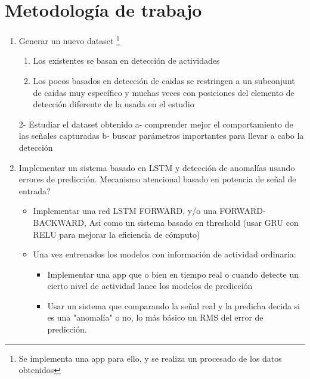 \documentclass[../tfm.tex]{subfiles}
\begin{document}

\section{Metodología de trabajo}


\begin{enumerate}
  \item Generar un nuevo dataset \footnote{Se implementa una app para ello, y se realiza un procesado de los datos obtenidos}
  \begin{enumerate}
    \item Los existentes se basan en detección de actividades
    \item Los pocos basados en detección de caidas se restringen a un subconjunt de caidas muy específico y muchas veces con posiciones del elemento de detección diferente de la usada en el estudio
  \end{enumerate}

  2- Estudiar el dataset obtenido
  a- comprender mejor el comportamiento de las señales capturadas
  b- buscar parámetros importantes para llevar a cabo la detección

  \item Implementar un sistema basado en LSTM y detección de anomalías usando errores de predicción. Mecanismo atencional basado en potencia de señal de entrada?
  \begin{itemize}
    \item Implementar una red LSTM FORWARD, y/o una FORWARD-BACKWARD, Asi como un sistema basado en threshold (usar GRU con RELU para mejorar la eficiencia de cómputo)
    \item Una vez entrenados los modelos con información de actividad ordinaria:
    \begin{itemize}
      \item Implementar una app que o bien en tiempo real o cuando detecte un cierto nivel de actividad lance los modelos de predicción
      \item Usar un sistema que comparando la señal real y la predicha decida si es una "anomalía" o no, lo más básico un RMS del error de predicción.
    \end{itemize}
  \end{itemize}


\end{enumerate}
\end{document}
